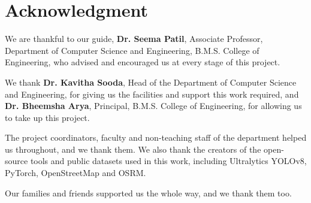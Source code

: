 \documentclass[12pt,a4paper]{report}
\begin{document}
\chapter*{Acknowledgment}
\thispagestyle{empty}
We are thankful to our guide, \textbf{Dr. Seema Patil}, Associate Professor, Department of Computer Science and Engineering, B.M.S. College of Engineering, who advised and encouraged us at every stage of this project.

We thank \textbf{Dr. Kavitha Sooda}, Head of the Department of Computer Science and Engineering, for giving us the facilities and support this work required, and \textbf{Dr. Bheemsha Arya}, Principal, B.M.S. College of Engineering, for allowing us to take up this project.

The project coordinators, faculty and non-teaching staff of the department helped us throughout, and we thank them. We also thank the creators of the open-source tools and public datasets used in this work, including Ultralytics YOLOv8, PyTorch, OpenStreetMap and OSRM.

Our families and friends supported us the whole way, and we thank them too.
\newpage
\tableofcontents
\thispagestyle{empty}
\newpage
\listoffigures
\thispagestyle{empty}
\newpage
\listoftables
\thispagestyle{empty}

\clearpage
{}
\setcounter{page}{1}









\clearpage
\renewcommand{\bibname}{REFERENCES}

\clearpage

\appendix
\renewcommand{\thechapter}{\Alph{chapter}}
\renewcommand{\thesection}{\Roman{section}}

\end{document}
